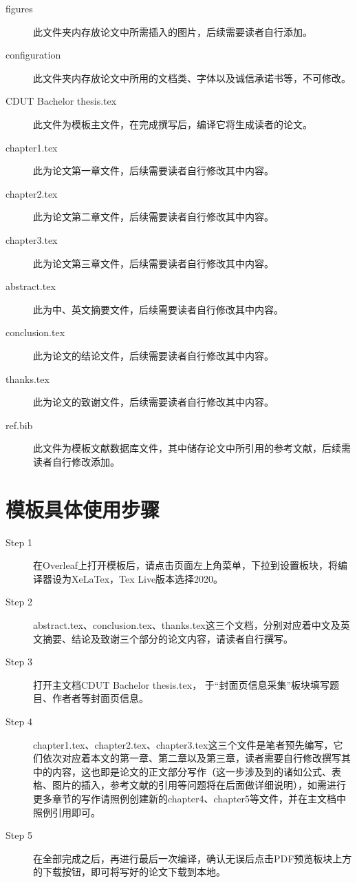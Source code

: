 \begin{description}
  \item[figures]  此文件夹内存放论文中所需插入的图片，后续需要读者自行添加。
  
  \item[configuration]  此文件夹内存放论文中所用的文档类、字体以及诚信承诺书等，不可修改。
  
  \item[CDUT Bachelor thesis.tex]  此文件为模板主文件，在完成撰写后，编译它将生成读者的论文。
  
  \item[chapter1.tex]  此为论文第一章文件，后续需要读者自行修改其中内容。
  
  \item[chapter2.tex]  此为论文第二章文件，后续需要读者自行修改其中内容。
  
  \item[chapter3.tex]  此为论文第三章文件，后续需要读者自行修改其中内容。
  
  \item[abstract.tex]  此为中、英文摘要文件，后续需要读者自行修改其中内容。
  
  \item[conclusion.tex]  此为论文的结论文件，后续需要读者自行修改其中内容。
  
  \item[thanks.tex]  此为论文的致谢文件，后续需要读者自行修改其中内容。
  
  \item[ref.bib]  此文件为模板文献数据库文件，其中储存论文中所引用的参考文献，后续需读者自行修改添加。
\end{description}

\section{模板具体使用步骤}

\begin{description}
  \item[Step 1]  在Overleaf上打开模板后，请点击页面左上角菜单，下拉到设置板块，将编译器设为XeLaTex，Tex Live版本选择2020。
  
  \item[Step 2]  abstract.tex、conclusion.tex、thanks.tex这三个文档，分别对应着中文及英文摘要、结论及致谢三个部分的论文内容，请读者自行撰写。

  \item[Step 3]  打开主文档CDUT Bachelor thesis.tex， 于“封面页信息采集”板块填写题目、作者者等封面页信息。

  \item[Step 4]  chapter1.tex、chapter2.tex、chapter3.tex这三个文件是笔者预先编写，它们依次对应着本文的第一章、第二章以及第三章，读者需要自行修改撰写其中的内容，这也即是论文的正文部分写作（这一步涉及到的诸如公式、表格、图片的插入，参考文献的引用等问题将在后面做详细说明），如需进行更多章节的写作请照例创建新的chapter4、chapter5等文件，并在主文档中照例引用即可。
  
  \item[Step 5]  在全部完成之后，再进行最后一次编译，确认无误后点击PDF预览板块上方的下载按钮，即可将写好的论文下载到本地。
\end{description}

